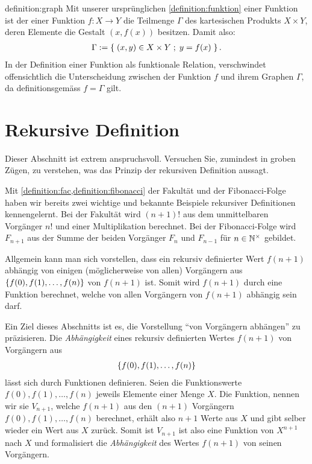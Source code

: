 \begin{definition}{definition:graph}
Mit unserer ursprünglichen \cref{definition:funktion} einer Funktion ist der  einer Funktion $f: X\to Y$ die Teilmenge $\Gamma$ des kartesischen Produkts $X\times Y$, deren Elemente die Gestalt $(x,f(x))$ besitzen. Damit also:
\begin{align*}
    \Gamma := \left\{\;(x,y)\in X\times Y \; ; \; y = f(x) \;\right\}.
\end{align*}
In der Definition einer Funktion als funktionale Relation, verschwindet offensichtlich die Unterscheidung zwischen der Funktion $f$ und ihrem Graphen $\Gamma$, da definitionsgemäss $f = \Gamma$ gilt.
\end{definition}


\section{Rekursive Definition}\label{sec:rekursion}
Dieser Abschnitt ist extrem anspruchsvoll. Versuchen Sie, zumindest in groben Zügen, zu verstehen, was das Prinzip der rekursiven Definition aussagt.

\noindent
Mit \cref{definition:fac,definition:fibonacci} der Fakultät und der Fibonacci-Folge haben wir bereits zwei wichtige und bekannte Beispiele rekursiver Definitionen kennengelernt. Bei der Fakultät wird $(n+1)!$ aus dem unmittelbaren Vorgänger $n!$ und einer Multiplikation berechnet. Bei der Fibonacci-Folge wird $F_{n+1}$ aus der Summe der beiden Vorgänger $F_{n}$ und $F_{n-1}$ für $n\in\mathbb{N}^{\times}$ gebildet.
\begin{myBox}{}
    Allgemein kann man sich vorstellen, dass ein rekursiv definierter Wert $f(n+1)$ abhängig von einigen (möglicherweise von allen) Vorgängern aus $\left\{f(0), f(1),\ldots, f(n)\right\}$ von $f(n+1)$ ist. Somit wird $f(n+1)$ durch eine Funktion berechnet, welche von allen Vorgängern von $f(n+1)$ abhängig sein darf.
\end{myBox}
Ein Ziel dieses Abschnitts ist es, die Vorstellung \enquote{von Vorgängern abhängen} zu präzisieren. Die \textit{Abhängigkeit} eines rekursiv definierten Wertes $f(n+1)$ von Vorgängern aus
\begin{align*}
    \left\{f(0), f(1),\ldots ,f(n)\right\}
\end{align*}
lässt sich durch Funktionen definieren. Seien die Funktionswerte $f(0), f(1),\ldots ,f(n)$ jeweils Elemente einer Menge $X$. Die Funktion, nennen wir sie $V_{n+1}$, welche $f(n+1)$ aus den $(n+1)$ Vorgängern $f(0), f(1),\ldots , f(n)$ berechnet, erhält also $n+1$ Werte aus $X$ und gibt selber wieder ein Wert aus $X$ zurück. Somit ist $V_{n+1}$ ist also eine Funktion von $X^{n+1}$ nach $X$ und formalisiert die \textit{Abhängigkeit} des Wertes $f(n+1)$ von seinen Vorgängern.

